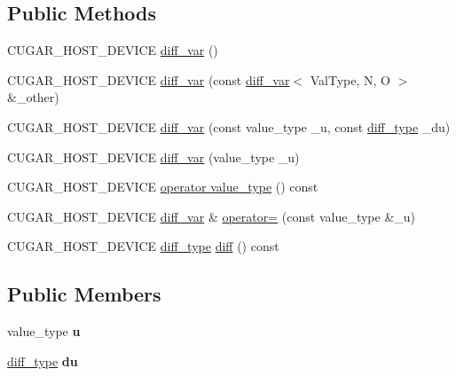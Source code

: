 \subsection*{Public Methods}
\begin{DoxyCompactItemize}
\item 
C\+U\+G\+A\+R\+\_\+\+H\+O\+S\+T\+\_\+\+D\+E\+V\+I\+CE \hyperlink{structcugar_1_1diff__var_aeb8a77349c388de8401541fa57fa2677}{diff\+\_\+var} ()
\item 
C\+U\+G\+A\+R\+\_\+\+H\+O\+S\+T\+\_\+\+D\+E\+V\+I\+CE \hyperlink{structcugar_1_1diff__var_a2c4d3739cc2516f30278285afd992f74}{diff\+\_\+var} (const \hyperlink{structcugar_1_1diff__var}{diff\+\_\+var}$<$ Val\+Type, N, O $>$ \&\+\_\+other)
\item 
C\+U\+G\+A\+R\+\_\+\+H\+O\+S\+T\+\_\+\+D\+E\+V\+I\+CE \hyperlink{structcugar_1_1diff__var_a3fa7d4d596c209e89ae543fe023666ca}{diff\+\_\+var} (const value\+\_\+type \+\_\+u, const \hyperlink{structcugar_1_1_vector}{diff\+\_\+type} \+\_\+du)
\item 
C\+U\+G\+A\+R\+\_\+\+H\+O\+S\+T\+\_\+\+D\+E\+V\+I\+CE \hyperlink{structcugar_1_1diff__var_a3dfedcb37cf1bdbf2f6b2f9bd15bc65f}{diff\+\_\+var} (value\+\_\+type \+\_\+u)
\item 
C\+U\+G\+A\+R\+\_\+\+H\+O\+S\+T\+\_\+\+D\+E\+V\+I\+CE \hyperlink{structcugar_1_1diff__var_a073bb39f8d7563a648e4fc8fc4056035}{operator value\+\_\+type} () const
\item 
C\+U\+G\+A\+R\+\_\+\+H\+O\+S\+T\+\_\+\+D\+E\+V\+I\+CE \hyperlink{structcugar_1_1diff__var}{diff\+\_\+var} \& \hyperlink{structcugar_1_1diff__var_a57e8d8d3aa5e039c93ebf2c165dd7516}{operator=} (const value\+\_\+type \&\+\_\+u)
\item 
C\+U\+G\+A\+R\+\_\+\+H\+O\+S\+T\+\_\+\+D\+E\+V\+I\+CE \hyperlink{structcugar_1_1_vector}{diff\+\_\+type} \hyperlink{structcugar_1_1diff__var_a5b4aa7e26e75bc03041ac1e15c81e960}{diff} () const
\end{DoxyCompactItemize}
\subsection*{Public Members}
\begin{DoxyCompactItemize}
\item 
\mbox{\label{structcugar_1_1diff__var_af95523ef626400e3787954df020e1192}} 
value\+\_\+type {\bfseries u}
\item 
\mbox{\label{structcugar_1_1diff__var_a1f1f32b25e1388fb09ac496b6b777b93}} 
\hyperlink{structcugar_1_1_vector}{diff\+\_\+type} {\bfseries du}
\end{DoxyCompactItemize}


